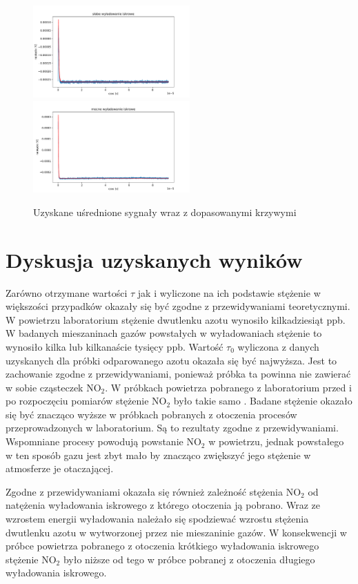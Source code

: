 \documentclass[10pt,a4paper]{article}
\begin{document}
\begin{figure}[h]
    \includegraphics[width=6cm]{spark1.pdf}
    \includegraphics[width=6cm]{spark2.pdf}
    \caption{Uzyskane uśrednione sygnały wraz z dopasowanymi krzywymi}
    \label{ch2_1}
\end{figure}

\newpage

\section{Dyskusja uzyskanych wyników}
Zarówno otrzymane wartości $\tau$ jak i wyliczone na ich podstawie stężenie w większości przypadków okazały się być zgodne z przewidywaniami teoretycznymi. W powietrzu laboratorium stężenie dwutlenku azotu wynosiło kilkadziesiąt ppb. W badanych mieszaninach gazów powstałych w wyładowaniach stężenie to wynosiło kilka lub kilkanaście tysięcy ppb.  Wartość $\tau_0$ wyliczona z danych uzyskanych dla próbki odparowanego azotu okazała się być najwyższa. Jest to zachowanie zgodne z przewidywaniami, ponieważ próbka ta powinna nie zawierać w sobie cząsteczek $\text{NO}_{\text{2}}$. W próbkach powietrza pobranego z laboratorium przed i po rozpoczęciu pomiarów stężenie $\text{NO}_{\text{2}}$ było takie samo . Badane stężenie okazało się być znacząco wyższe w próbkach pobranych z otoczenia procesów przeprowadzonych w laboratorium. Są to rezultaty zgodne z przewidywaniami. Wspomniane procesy powodują powstanie $\text{NO}_{\text{2}}$ w powietrzu, jednak powstałego w ten sposób gazu jest zbyt mało by znacząco zwiększyć jego stężenie w atmosferze je otaczającej.

Zgodne z przewidywaniami okazała się również zależność stężenia $\text{NO}_{\text{2}}$ od natężenia wyładowania iskrowego z którego otoczenia ją pobrano. Wraz ze wzrostem energii wyładowania należało się spodziewać wzrostu stężenia dwutlenku azotu w wytworzonej przez nie mieszaninie gazów. W konsekwencji w próbce powietrza pobranego z otoczenia krótkiego wyładowania iskrowego stężenie $\text{NO}_{\text{2}}$ było niższe od tego w próbce pobranej z otoczenia długiego wyładowania iskrowego.
\end{document}
